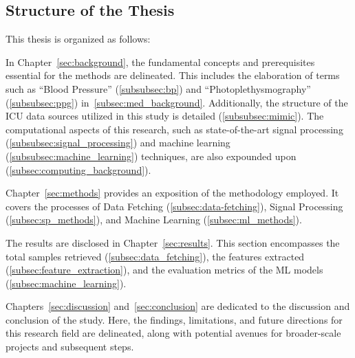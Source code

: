 \subsection{Structure of the Thesis}
\label{subsec:structure}

This thesis is organized as follows:

In Chapter~\ref{sec:background}, the fundamental concepts and prerequisites essential for the methods are delineated.
This includes the elaboration of terms such as \enquote{Blood Pressure} (\ref{subsubsec:bp}) and \enquote{Photoplethysmography} (\ref{subsubsec:ppg}) in~\ref{subsec:med_background}.
Additionally, the structure of the ICU data sources utilized in this study is detailed (\ref{subsubsec:mimic}).
The computational aspects of this research, such as state-of-the-art signal processing (\ref{subsubsec:signal_processing}) and machine learning (\ref{subsubsec:machine_learning}) techniques, are also expounded upon (\ref{subsec:computing_background}).

Chapter~\ref{sec:methods} provides an exposition of the methodology employed.
It covers the processes of Data Fetching (\ref{subsec:data-fetching}), Signal Processing (\ref{subsec:sp_methods}), and Machine Learning (\ref{subsec:ml_methods}).

The results are disclosed in Chapter~\ref{sec:results}.
This section encompasses the total samples retrieved (\ref{subsec:data_fetching}), the features extracted (\ref{subsec:feature_extraction}), and the evaluation metrics of the ML models (\ref{subsec:machine_learning}).

Chapters~\ref{sec:discussion} and~\ref{sec:conclusion} are dedicated to the discussion and conclusion of the study.
Here, the findings, limitations, and future directions for this research field are delineated, along with potential avenues for broader-scale projects and subsequent steps.